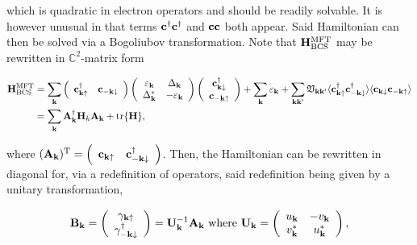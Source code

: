 \documentclass{homework}
\begin{document}
which is quadratic in electron operators and should be readily solvable. It is however unusual in that terms ${\bf c}^\dagger {\bf c}^\dagger$ and ${\bf c} {\bf c}$ both appear. Said Hamiltonian can then be solved via a Bogoliubov transformation. Note that ${\bf H}_{\textnormal{BCS}}^{\textnormal{MFT}}$ may be rewritten in $\mathds{C}^2$-matrix form 

\begin{equation}
\begin{split}
    {\bf H}_{\textnormal{BCS}}^{\textnormal{MFT}} &= \sum_{{\bf k}} \left( \begin{array}{cc}
        {\bf c}_{{\bf k}\uparrow}^\dagger & {\bf c}_{-{\bf k}\downarrow} \\ 
    \end{array} \right) \left(\begin{array}{cc}
        \varepsilon_{\bf k} &  \Delta_{{\bf k}}\\
        \Delta_{{\bf k}}^* & -\varepsilon_{\bf k}
    \end{array} \right) \left( \begin{array}{c}
        {\bf c}_{{\bf k}\downarrow}^\dagger \\
        {\bf c}_{-{\bf k}\uparrow} 
    \end{array} \right) + \sum_{{\bf k}} \varepsilon_{{\bf k}} + \sum_{{\bf k} {\bf k'}} \mathfrak{V}_{{\bf k} {\bf k'}} \langle {\bf c}_{{\bf k} \uparrow}^\dagger {\bf c}_{-{\bf k} \downarrow}^\dagger \rangle \langle {\bf c}_{{\bf k} \downarrow} {\bf c}_{-{\bf k} \uparrow} \rangle \\
    &= \sum_{{\bf k}} {\bf A}_{{\bf k}}^\dagger {\bf H}_k {\bf A}_{{\bf k}} + \tr {\bf H},
\end{split}
\end{equation}

where $({\bf A}_{\bf k})^{\textnormal{T}} = \left( \begin{array}{cc}
     {\bf c}_{{\bf k}\uparrow} &
     {\bf c}_{-{\bf k}\downarrow}^\dagger  
\end{array} \right)$. Then, the Hamiltonian can be rewritten in diagonal for, via a redefinition of operators, said redefinition being given by a unitary transformation,

\begin{align}
    {\bf B}_{{\bf k}} = \left( \begin{array}{c}
     {\gamma}_{{\bf k}\uparrow}  \\
     {\gamma}_{-{\bf k}\downarrow}^\dagger  
\end{array} \right) = {\bf U}_{{\bf k}}^{-1} {\bf A}_{\bf k} \textnormal{ where } {\bf U}_{\bf k} = \left( \begin{array}{cc}
    u_{{\bf k}} & -v_{{\bf k}} \\
    v_{{\bf k}}^* & u_{{\bf k}}^*
\end{array} \right),
\end{align}
\end{document}

